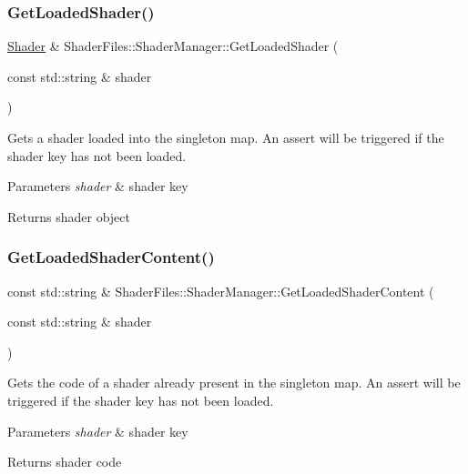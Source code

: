 \subsubsection{\texorpdfstring{GetLoadedShader()}{GetLoadedShader()}}
{\footnotesize\ttfamily \mbox{\hyperlink{class_shader_files_1_1_shader}{Shader}} \& Shader\+Files\+::\+Shader\+Manager\+::\+Get\+Loaded\+Shader (\begin{DoxyParamCaption}\item[{const std\+::string \&}]{shader }\end{DoxyParamCaption})}

Gets a shader loaded into the singleton map. An assert will be triggered if the shader key has not been loaded. 
\begin{DoxyParams}{Parameters}
{\em shader} & shader key \\
\hline
\end{DoxyParams}
\begin{DoxyReturn}{Returns}
shader object 
\end{DoxyReturn}
\mbox{\label{class_shader_files_1_1_shader_manager_a82aa01b675a8ef29aa1283f86574166e}} 
\subsubsection{\texorpdfstring{GetLoadedShaderContent()}{GetLoadedShaderContent()}}
{\footnotesize\ttfamily const std\+::string \& Shader\+Files\+::\+Shader\+Manager\+::\+Get\+Loaded\+Shader\+Content (\begin{DoxyParamCaption}\item[{const std\+::string \&}]{shader }\end{DoxyParamCaption})}

Gets the code of a shader already present in the singleton map. An assert will be triggered if the shader key has not been loaded. 
\begin{DoxyParams}{Parameters}
{\em shader} & shader key \\
\hline
\end{DoxyParams}
\begin{DoxyReturn}{Returns}
shader code 
\end{DoxyReturn}
\mbox{\label{class_shader_files_1_1_shader_manager_a4f0f22c76362af7b485116517a38415f}} 
